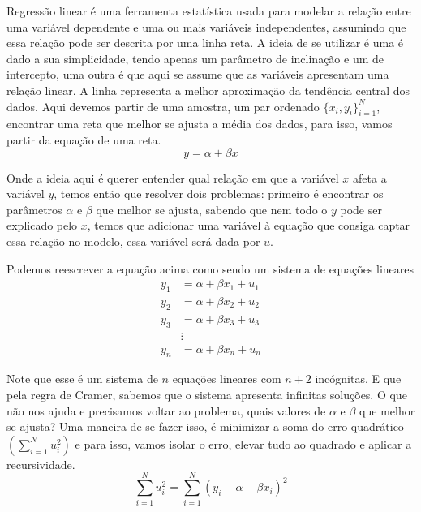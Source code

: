 \documentclass[
  letterpaper,
  DIV=11,
  numbers=noendperiod]{scrreprt}
\theoremstyle{definition}
\theoremstyle{plain}
\theoremstyle{remark}
\begin{document}
Regressão linear é uma ferramenta estatística usada para modelar a
relação entre uma variável dependente e uma ou mais variáveis
independentes, assumindo que essa relação pode ser descrita por uma
linha reta. A ideia de se utilizar é uma é dado a sua simplicidade,
tendo apenas um parâmetro de inclinação e um de intercepto, uma outra é
que aqui se assume que as variáveis apresentam uma relação linear. A
linha representa a melhor aproximação da tendência central dos dados.
Aqui devemos partir de uma amostra, um par ordenado
\(\{x_{i},y_{i}\}^{N}_{i=1}\), encontrar uma reta que melhor se ajusta a
média dos dados, para isso, vamos partir da equação de uma reta. \[
y=\alpha + \beta x
\]

Onde a ideia aqui é querer entender qual relação em que a variável \(x\)
afeta a variável \(y\), temos então que resolver dois problemas:
primeiro é encontrar os parâmetros \(\alpha\) e \(\beta\) que melhor se
ajusta, sabendo que nem todo o \(y\) pode ser explicado pelo \(x\),
temos que adicionar uma variável à equação que consiga captar essa
relação no modelo, essa variável será dada por \(u\).

Podemos reescrever a equação acima como sendo um sistema de equações
lineares \[
\begin{aligned}
  y_{1} &= \alpha + \beta x_{1} + u_{1} \\
  y_{2} &= \alpha + \beta x_{2} + u_{2} \\
  y_{3} &= \alpha + \beta x_{3} + u_{3} \\
  & \vdots \\
  y_{n} &= \alpha + \beta x_{n} + u_{n}
\end{aligned}
\]

Note que esse é um sistema de \(n\) equações lineares com \(n + 2\)
incógnitas. E que pela regra de Cramer, sabemos que o sistema apresenta
infinitas soluções. O que não nos ajuda e precisamos voltar ao problema,
quais valores de \(\alpha\) e \(\beta\) que melhor se ajusta? Uma
maneira de se fazer isso, é minimizar a soma do erro quadrático
\(\left(\sum_{i=1}^{N} u_i^{2}\right)\) e para isso, vamos isolar o
erro, elevar tudo ao quadrado e aplicar a recursividade. \[
\sum_{i=1}^{N} u_i^{2} = \sum_{i=1}^{N} (y_{i} - \alpha - \beta x_{i})^{2}
\]
\end{document}
